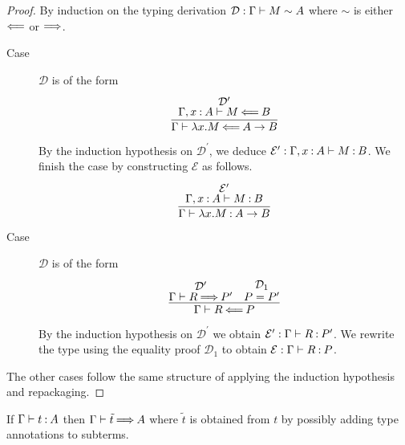 \documentclass[11pt,letterpaper]{article}
\begin{document}
\begin{proof}
  By induction on the typing derivation
  $\mathcal{D} : \Gamma \vdash M \sim A$ where $\sim$ is either
  $\mathbin{\Longleftarrow}$ or $\mathbin{\Longrightarrow}$.

  \begin{description}
    \item[Case]
      $\mathcal{D}$ is of the form
      \begin{equation*}
        \infer{
          \Gamma \proves \lambda x. M \checks A \to B
        }{
          \deduce[\mathcal{D}^\prime]{
            \Gamma, x\hastype A \proves M \checks B
          }{}
        }
      \end{equation*}

      By the induction hypothesis on $\mathcal{D}^\prime$,
      we deduce
      $\mathcal{E}^\prime : \Gamma, x\mathbin{:} A \vdash M \mathbin{:} B$.
      We finish the case by constructing $\mathcal{E}$ as follows.
      \begin{equation*}
        \infer{
          \Gamma \proves \lambda x. M \hastype A \to B
        }{
          \deduce[\mathcal{E}^\prime]{
            \Gamma, x\hastype A \proves M \hastype B
          }{}
        }
      \end{equation*}

    \item[Case]
      $\mathcal{D}$ is of the form
      \begin{equation*}
        \infer{
          \Gamma \proves R \checks P
        }{
          \deduce[\mathcal{D}^\prime]{\Gamma \proves R \synth P^\prime}{}
          &
          \deduce[\mathcal{D}_1]{P = P^\prime}{}
        }
      \end{equation*}

      By the induction hypothesis on $\mathcal{D}^\prime$ we obtain
      $\mathcal{E}^\prime : \Gamma \vdash R \mathbin{:} P^\prime$.
      We rewrite the type using the equality proof $\mathcal{D}_1$ to obtain
      $\mathcal{E} : \Gamma \vdash R \mathbin{:} P$.
  \end{description}

  The other cases follow the same structure of applying the induction
  hypothesis and repackaging.
\end{proof}

\begin{prop}[Completeness]
  If $\Gamma \vdash t \mathbin{:} A$ then $\Gamma \vdash \tilde t \mathbin{\Longrightarrow} A$
  where $\tilde t$ is obtained from $t$ by possibly adding type annotations to
  subterms.
\end{prop}
\end{document}
